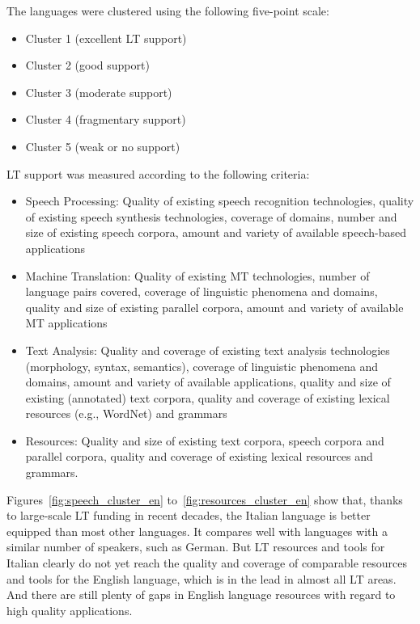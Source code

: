 \documentclass[]{../../metanetpaper}
\begin{document}
\begin{multicols}{2}
The languages were clustered using the following five-point scale: 


    \begin{itemize}
      \item Cluster 1 (excellent LT support)
      \item Cluster 2 (good support)
      \item Cluster 3 (moderate support)
      \item Cluster 4 (fragmentary support) 
      \item Cluster 5 (weak or no support)
    \end{itemize}


LT support was measured according to the following criteria:


\begin{itemize}
\item Speech Processing: Quality of existing speech recognition technologies, quality of existing speech synthesis 
technologies, coverage of domains, number and size of existing speech corpora, amount and variety of available 
speech-based applications
\item Machine Translation: Quality of existing MT technologies, number of language pairs covered, 
coverage of linguistic phenomena and domains, quality and size of existing parallel corpora, amount and variety 
of available MT applications
\item Text Analysis: Quality and coverage of existing text analysis technologies (morphology, syntax, semantics), 
coverage of linguistic phenomena and domains, amount and variety of available applications, quality and size of 
existing (annotated) text corpora, quality and coverage of existing lexical resources (e.g., WordNet) and grammars
\item Resources: Quality and size of existing text corpora, speech corpora and parallel corpora, quality and coverage of existing lexical resources and grammars.
\end{itemize} 



Figures~\ref{fig:speech_cluster_en} to~\ref{fig:resources_cluster_en} show that, thanks to large-scale LT funding in recent decades, the Italian language is better equipped than most other languages. It compares well with languages with a similar number of speakers, such as German. But LT resources and tools for Italian clearly do not yet reach the quality and coverage of comparable resources and tools for the English language, which is in the lead in almost all LT areas. And there are still plenty of gaps in English language resources with regard to high quality applications.


\end{multicols}
\end{document}
